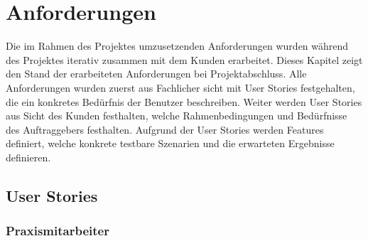 \section{Anforderungen}\label{sec:anforderungen}

Die im Rahmen des Projektes umzusetzenden Anforderungen wurden während des Projektes iterativ zusammen mit dem Kunden erarbeitet.
Dieses Kapitel zeigt den Stand der erarbeiteten Anforderungen bei Projektabschluss.
Alle Anforderungen wurden zuerst aus Fachlicher sicht mit User Stories festgehalten, die ein konkretes Bedürfnis der Benutzer beschreiben.
Weiter werden User Stories aus Sicht des Kunden festhalten, welche Rahmenbedingungen und Bedürfnisse des Auftraggebers festhalten.
Aufgrund der User Stories werden Features definiert, welche konkrete testbare Szenarien und die erwarteten Ergebnisse definieren.

\subsection{User Stories}\label{subsec:user-stories}

\subsubsection*{Praxismitarbeiter}

